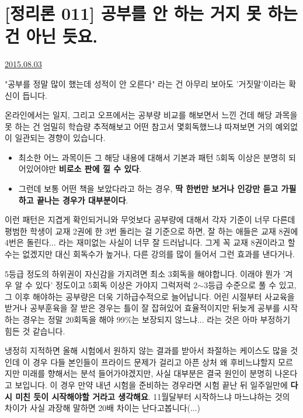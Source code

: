 \section{[정리론 011] 공부를 안 하는 거지 못 하는 건 아닌 듯요.}
\href{https://www.kockoc.com/Apoc/229108}{2015.08.03}

\vspace{5mm}

"공부를 정말 많이 했는데 성적이 안 오른다"
라는 건 아무리 보아도 '거짓말'이라는 확신이 듭니다.
\vspace{5mm}

온라인에서는 일지, 그리고 오프에서는 공부량 비교를 해보면서 느낀 건데
해당 과목을 못 하는 건 엄밀히 학습량 추적해보고 어떤 참고서 몇회독했느냐 따져보면
거의 예외없이 일관되는 경향이 있습니다.
\vspace{5mm}

\begin{itemize}
    
    \item  최소한 어느 과목이든 그 해당 내용에 대해서 기본과 패턴 5회독 이상은 분명히 되어있어야만 \textbf{비로소 판에 낄 수 있다}.
    \item  그런데 보통 어떤 책을 보았다라고 하는 경우, \textbf{딱 한번만 보거나 인강만 듣고 가필하고 끝나는 경우가 대부분이다}.
\end{itemize}
\vspace{5mm}

이런 패턴은 지겹게 확인되거니와
무엇보다 공부량에 대해서 각자 기준이 너무 다른데
평범한 학생이 교재 2권에 한 3번 돌리는 걸 기준으로 하면, 잘 하는 애들은 교재 8권에 4번은 돌린다... 라는 재미없는 사실이 너무 잘 드러납니다.
그게 꼭 교재 8권이라고 할 수는 없겠지만 대신 회독수가 높거나, 다른 강의를 많이 들어서 그런 효과를 낸다거나.
\vspace{5mm}

5등급 정도의 하위권이 자신감을 가지려면 최소 3회독을 해야합니다. 이래야 뭔가 '겨우 알 수 있다' 정도이고
5회독 이상은 가야지 그럭저럭 2$\sim$3등급 수준으로 풀 수 있고, 그 이후 해야하는 공부량은 더욱 기하급수적으로 늘어납니다.
어린 시절부터 사교육을 받거나 공부훈육을 잘 받은 경우는 틀이 잘 잡혀있어 효율적이지만
뒤늦게 공부를 시작하는 경우는 정말 20회독을 해야 99$\%$는 보장되지 않느냐... 라는 것은 아마 부정하기 힘든 것 같습니다.
\vspace{5mm}

냉정히 지적하면 올해 시험에서 원하지 않는 결과를 받아서 좌절하는 케이스도 많을 것인데
이 경우 다들 본인들이 프라이드 문제가 걸리고 아픈 상처 왜 후비느냐할지 모르지만
미래를 향해서는 분석 들어가야겠지만, 사실 대부분은 결국 원인이 분명히 나온다고 보입니다.
이 경우 만약 내년 시험을 준비하는 경우라면 시험 끝난 뒤 일주일만에 \textbf{다시 미친 듯이 시작해야할 거라고 생각해요}.
11월달부터 시작하느냐 마느냐하는 것의 차이가 사실 과장해 말하면 20배 차이는 난다고봅니다(...)
\vspace{5mm}

